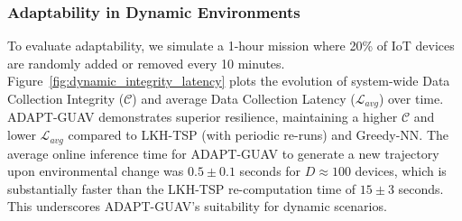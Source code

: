 \documentclass[10pt,conference,letterpaper]{IEEEtran}
\begin{document}
\begin{table}[htbp]
\centering
\caption{Performance Comparison in Diverse Static Environments ($D=50$ devices).}
\label{tab:static_results_D50}
\end{table}


\subsubsection{Adaptability in Dynamic Environments}
\label{ssubsec:exp_dynamic}
To evaluate adaptability, we simulate a 1-hour mission where 20\% of IoT devices are randomly added or removed every 10 minutes. Figure~\ref{fig:dynamic_integrity_latency} plots the evolution of system-wide Data Collection Integrity ($\mathcal{C}$) and average Data Collection Latency ($\mathcal{L}_{avg}$) over time. ADAPT-GUAV demonstrates superior resilience, maintaining a higher $\mathcal{C}$ and lower $\mathcal{L}_{avg}$ compared to LKH-TSP (with periodic re-runs) and Greedy-NN. The average online inference time for ADAPT-GUAV to generate a new trajectory upon environmental change was $0.5 \pm 0.1$ seconds for $D \approx 100$ devices, which is substantially faster than the LKH-TSP re-computation time of $15 \pm 3$ seconds. This underscores ADAPT-GUAV's suitability for dynamic scenarios.
\end{document}
